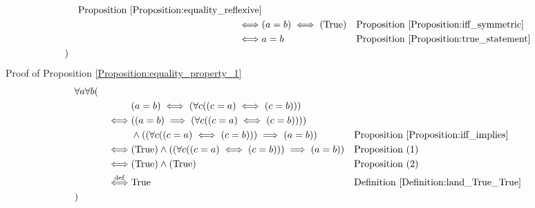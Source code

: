 \begin{prop}
\begin{align*}
& & \text{Proposition \ref{Proposition:equality_reflexive}} \\
& & \iff & (a = b) \iff (\text{True})
& & \text{Proposition \ref{Proposition:iff_symmetric}} \\
& & \iff & a = b
& & \text{Proposition \ref{Proposition:true_statement}} \\
& )
\end{align*}
Proof of Proposition \ref{Proposition:equality_property_1}
\begin{align*}
& \forall a \forall b ( \\
& & & (a = b) \iff (\forall c ((c = a) \iff (c = b))) \\
& & \iff & ((a = b) \implies (\forall c ((c = a) \iff (c = b)))) \\
& & & \land ((\forall c ((c = a) \iff (c = b))) \implies (a = b))
& & \text{Proposition \ref{Proposition:iff_implies}} \\
& & \iff & (\text{True}) \land ((\forall c ((c = a) \iff (c = b))) \implies (a = b))
& & \text{Proposition (1)} \\
& & \iff & (\text{True}) \land (\text{True})
& & \text{Proposition (2)} \\
& & \overset{\operatorname{def}}{\iff} & \text{True}
& & \text{Definition \ref{Definition:land_True_True}} \\
& )
\end{align*}
\end{prop}

